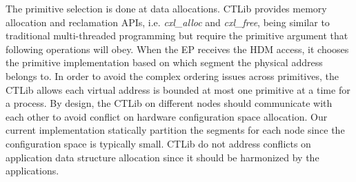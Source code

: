 \ifx\stale\undefined
The primitive selection is done at data allocations. 
CTLib provides memory allocation and reclamation APIs, i.e. \textit{cxl\_alloc} and \textit{cxl\_free}, being similar to traditional multi-threaded programming but require the primitive argument that following operations will obey. 
When the EP receives the HDM access, it chooses the primitive implementation based on which segment the physical address belongs to. 
In order to avoid the complex ordering issues across primitives, the CTLib allows each virtual address is bounded at most one primitive at a time for a process. 
By design, the CTLib on different nodes should communicate with each other to avoid conflict on hardware configuration space allocation. Our current implementation statically partition the segments for each node since the configuration space is typically small. CTLib do not address conflicts on application data structure allocation since it should be harmonized by the applications. 
\fi



